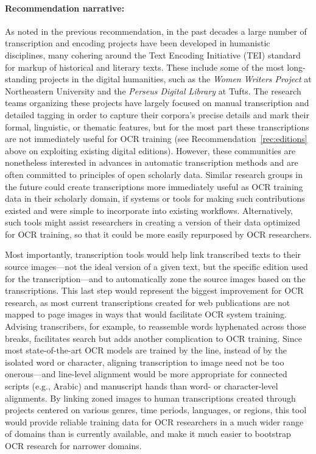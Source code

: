 \documentclass[twoside,11pt]{report}
\begin{document}
\paragraph{Recommendation narrative:}

As noted in the previous recommendation, in the past decades a large number of transcription and encoding projects have been developed in humanistic disciplines, many cohering around the Text Encoding Initiative (TEI) standard for markup of historical and literary texts. These include some of the most long-standing projects in the digital humanities, such as the \emph{Women Writers Project} at Northeastern University and the \emph{Perseus Digital Library} at Tufts. The research teams organizing these projects have largely focused on manual transcription and detailed tagging in order to capture their corpora's precise details and mark their formal, linguistic, or thematic features, but for the most part these transcriptions are not immediately useful for OCR training (see Recommendation~\ref{rec:editions} above on exploiting existing digital editions). However, these communities are nonetheless interested in advances in automatic transcription methods and are often committed to principles of open scholarly data. Similar research groups in the future could create transcriptions more immediately useful as OCR training data in their scholarly domain, if systems or tools for making such contributions existed and were simple to incorporate into existing workflows. Alternatively, such tools might assist researchers in creating a version of their data optimized for OCR training, so that it could be more easily repurposed by OCR researchers.

Most importantly, transcription tools would help link transcribed texts to their source images---not the ideal version of a given text, but the specific edition used for the transcription---and to automatically zone the source images based on the transcriptions.  This last step would represent the biggest improvement for OCR research, as most current transcriptions created for web publications are not mapped to page images in ways that would facilitate OCR system training. Advising transcribers, for example, to reassemble words hyphenated across those breaks, facilitates search but adds another complication to OCR training. Since most state-of-the-art OCR models are trained by the line, instead of by the isolated word or character, aligning transcription to image need not be too onerous---and line-level alignment would be more appropriate for connected scripts (e.g., Arabic) and manuscript hands than word- or character-level alignments. By linking zoned images to human transcriptions created through projects centered on various genres, time periods, languages, or regions, this tool would provide reliable training data for OCR researchers in a much wider range of domains than is currently available, and make it much easier to bootstrap OCR research for narrower domains.
\end{document}
